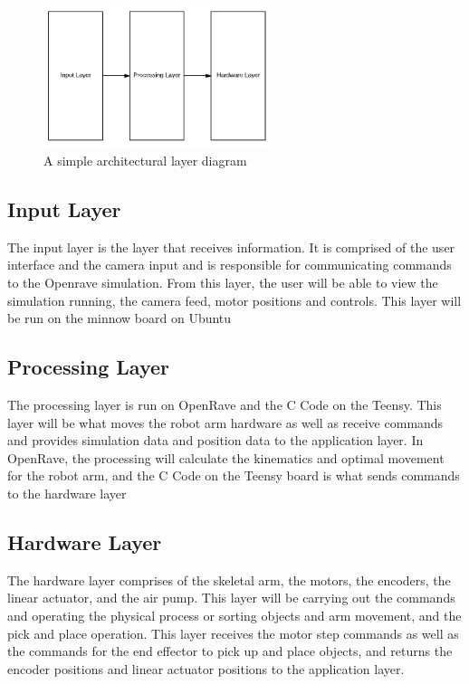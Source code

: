 

\begin{figure}[h!]
	\centering
 	\includegraphics[width=0.60\textwidth]{images/layer_diagram}
 \caption{A simple architectural layer diagram}
\end{figure}

\subsection{Input Layer}


The input layer is the layer that receives information. It is comprised of the user interface and the camera input and is responsible for communicating commands to the Openrave simulation. From this layer, the user will be able to view the simulation running, the camera feed, motor positions and controls. This layer will be run on the minnow board on Ubuntu

\subsection{Processing Layer}

The processing layer is run on OpenRave and the C Code on the Teensy. This layer will be what moves the robot arm hardware as well as receive commands and provides simulation data and position data to the application layer. In OpenRave, the processing will calculate the kinematics and optimal movement for the robot arm, and the C Code on the Teensy board is what sends commands to the hardware layer

\subsection{Hardware Layer}

The hardware layer comprises of the skeletal arm, the motors, the encoders, the linear actuator, and the air pump. This layer will be carrying out the commands and operating the physical process or sorting objects and arm movement, and the pick and place operation. This layer receives the motor step commands as well as the commands for the end effector to pick up and place objects, and returns the encoder positions and linear actuator positions to the application layer.

